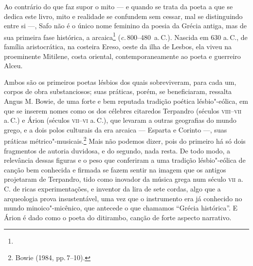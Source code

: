 \noindent{}Ao contrário do que faz supor o mito --- e quando se trata da poeta a que se
dedica este livro, mito e realidade se confundem sem cessar, mal se
distinguindo entre si ---, Safo não é o único nome feminino da poesia da Grécia
	antiga, mas de sua primeira fase histórica, a arcaica\footnote{} (\emph{c.}\,800--480~a.\,C.). Nascida em 630 a.\,C., de família
aristocrática, na costeira Ereso, oeste da ilha de Lesbos, ela viveu na
proeminente Mitilene, costa oriental, contemporaneamente ao poeta e guerreiro
Alceu.

Ambos são os primeiros poetas lésbios dos quais sobreviveram, para cada
um, corpos de obra substanciosos; suas práticas, porém, se beneficiaram,
ressalta Angus M. Bowie, de uma forte e bem reputada tradição
poética lésbio"-eólica, em que se inserem nomes como os dos célebres citaredos
Terpandro (séculos \textsc{viii}--\textsc{vii} a.\,C.) e Árion (séculos
\textsc{vii}--\textsc{vi} a.\,C.), que levaram a
outras geografias do mundo grego, e a dois polos culturais da era arcaica ---
	Esparta e Corinto ---, suas práticas métrico"-musicais.\footnote{ Bowie (1984,
	pp.\,7--10).} Mais não podemos dizer,
pois do primeiro há só dois fragmentos de autoria duvidosa, e do segundo, nada
resta. De todo modo, a relevância dessas figuras e o peso que conferiram a uma
tradição lésbio"-eólica de canção bem conhecida e firmada se
fazem sentir na imagem que os antigos projetaram de Terpandro, tido como
inovador da música grega num século \textsc{vii} a.\,C. de ricas experimentações, e
inventor da lira de sete cordas, algo que a arqueologia prova insustentável,
uma vez que o instrumento era já conhecido no mundo minoico"-micênico, que
antecede o que chamamos “Grécia histórica”. E Árion é dado como o
poeta do ditirambo, canção de forte aspecto narrativo.

